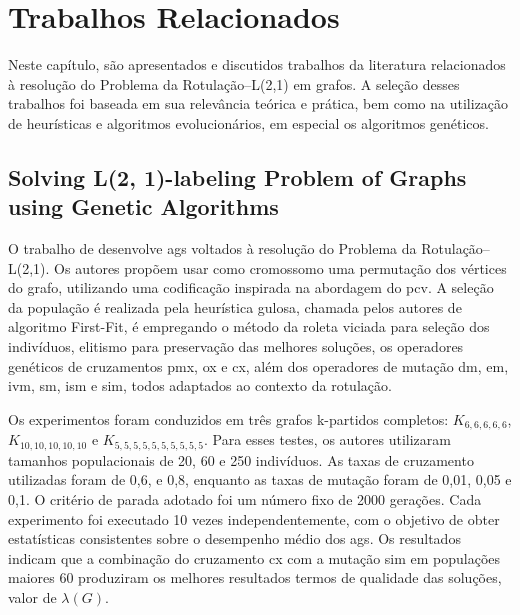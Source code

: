 \chapter{Trabalhos Relacionados}
\label{cap:trabalhos-relacionados}

Neste capítulo, são apresentados e discutidos trabalhos da literatura relacionados à resolução do Problema da Rotulação–L(2,1) em grafos. A seleção desses trabalhos foi baseada em sua relevância teórica e prática, bem como na utilização de heurísticas e algoritmos evolucionários, em especial os algoritmos genéticos.

\section{Solving L(2, 1)-labeling Problem of Graphs using Genetic Algorithms}

O trabalho de  desenvolve \glspl{ag} voltados à resolução do Problema da Rotulação–L(2,1). Os autores propõem usar como cromossomo uma permutação dos vértices do grafo, utilizando uma codificação inspirada na abordagem do \gls{pcv}. A seleção da população é realizada pela heurística gulosa, chamada pelos autores de algoritmo First-Fit, é empregando o método da roleta viciada para seleção dos indivíduos, elitismo para preservação das melhores soluções, os operadores genéticos de cruzamentos \gls{pmx}, \gls{ox} e \gls{cx}, além dos operadores de mutação \gls{dm}, \gls{em}, \gls{ivm}, \gls{sm}, \gls{ism} e \gls{sim}, todos adaptados ao contexto da rotulação.

Os experimentos foram conduzidos em três grafos k-partidos completos: $K_{6,6,6,6,6}$, $K_{10,10,10,10,10}$ e $K_{5,5,5,5,5,5,5,5,5,5}$. Para esses testes, os autores utilizaram tamanhos populacionais de 20, 60 e 250 indivíduos. As taxas de cruzamento utilizadas foram de 0{,}6, e 0{,}8, enquanto as taxas de mutação foram de 0{,}01, 0{,}05 e 0{,}1. O critério de parada adotado foi um número fixo de 2000 gerações. Cada experimento foi executado 10 vezes independentemente, com o objetivo de obter estatísticas consistentes sobre o desempenho médio dos \glspl{ag}. Os resultados indicam que a combinação do cruzamento \gls{cx} com a mutação \gls{sim} em populações maiores 60 produziram os melhores resultados termos de qualidade das soluções, valor de $\lambda(G)$. 

